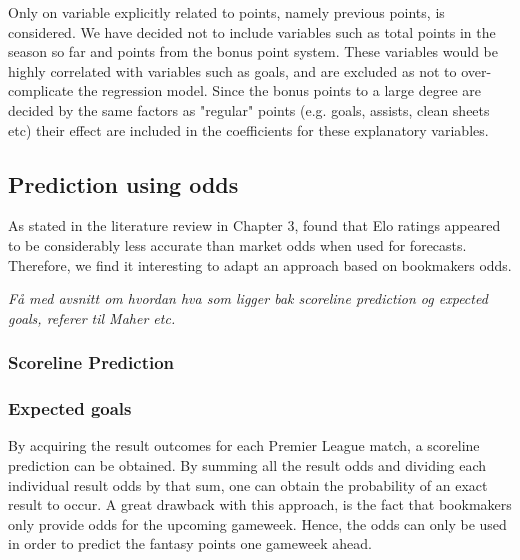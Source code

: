 Only on variable explicitly related to points, namely previous points, is considered. We have decided not to include variables such as total points in the season so far and points from the bonus point system. These variables would be highly correlated with variables such as goals, and are excluded as not to over-complicate the regression model. Since the bonus points to a large degree are decided by the same factors as "regular" points (e.g. goals, assists, clean sheets etc) their effect are included in the coefficients for these explanatory variables. 


\subsection{Prediction using odds}
As stated in the literature review in Chapter 3, \cite{Hvattum} found that Elo ratings appeared to be considerably less accurate than market odds when used for forecasts. Therefore, we find it interesting to adapt an approach based on bookmakers odds. 

\newpar

\textit{Få med avsnitt om hvordan hva som ligger bak scoreline prediction og expected goals, referer til Maher etc.}

\subsubsection{Scoreline Prediction}
\subsubsection{Expected goals}

\newpar

By acquiring the result outcomes for each Premier League match, a scoreline prediction can be obtained. By summing all the result odds and dividing each individual result odds by that sum, one can obtain the probability of an exact result to occur. A great drawback with this approach, is the fact that bookmakers only provide odds for the upcoming gameweek. Hence, the odds can only be used in order to predict the fantasy points one gameweek ahead. 

\newpar

